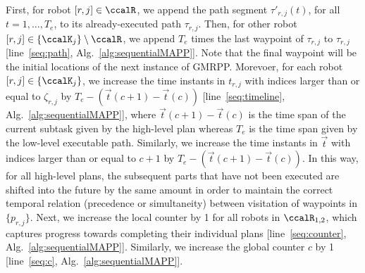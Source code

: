 \documentclass[Afour,sageh,times]{sagej}
\newcommand{\vertex}[1]{v_{\textup{#1}}}
\begin{document}
{{%

First, for robot $[r, j] \in \ccalR$, we append the path segment $\tau'_{r,j}(t)$, for all $t=1,\ldots, T_e$, to its already-executed path $\tau_{r,j}$. Then, for other robot $[r,j] \in \{\ccalK_j\}\setminus \ccalR$, we  append  $T_e$ times the last waypoint of  $\tau_{r,j}$  to $\tau_{r,j}$ [line~\ref{seq:path}, Alg.~\ref{alg:sequentialMAPP}]. Note that the final waypoint will be the initial locations of the next instance of GMRPP.  Morevoer, for each robot $[r,j] \in \{\ccalK_j\}$, we increase the time instants in $t_{r,j}$ with indices larger than or equal to  $\zeta_{r,j}$ by $T_e - (\vec{t}(c+1) - \vec{t}(c))$ [line~\ref{seq:timeline}, Alg.~\ref{alg:sequentialMAPP}], where $\vec{t}(c+1) - \vec{t}(c)$ is the time span of the current subtask  given by the high-level plan whereas $T_e$ is the time span given by the low-level executable path.
    Similarly, we increase the time instants in $\vec{t}$ with indices larger than or equal to  $c+1$ by $T_e - (\vec{t}(c+1)- \vec{t}(c))$.
    In this way, for all high-level plans, the subsequent parts that have not been executed are shifted into the future by the same amount in order to maintain the correct temporal relation (precedence or simultaneity) between visitation of waypoints in $\{p_{r,j}\}$. Next, we increase  the local counter by 1 for all robots in $\ccalR_{1,2}$, which captures progress towards completing their individual plans [line~\ref{seq:counter}, Alg.~\ref{alg:sequentialMAPP}]. Similarly, we increase the global counter $c$ by 1 [line~\ref{seq:c}, Alg.~\ref{alg:sequentialMAPP}].}


}
\end{document}
